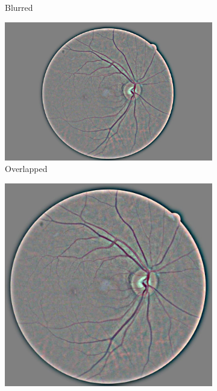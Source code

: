 \begin{figure}[tb]
\begin{subfigure}[b]{0.24\textwidth}
        \caption{Blurred}
    \end{subfigure}
    \hfill
     \begin{subfigure}[b]{0.24\textwidth}
        \centering
        \includegraphics[width=\textwidth, height=\textwidth]{figures/chapter4/Preprocessing/weighted.jpg}
        \caption{Overlapped}
    \end{subfigure}
    \hfill
     \begin{subfigure}[b]{0.24\textwidth}
        \centering
        \includegraphics[width=\textwidth, height=\textwidth]{figures/chapter4/Preprocessing/cropped.jpg}

\end{subfigure}
\end{figure}

